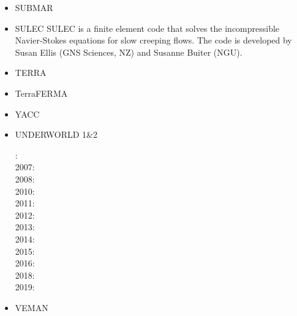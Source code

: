 \begin{itemize}
\item SUBMAR
\cite{masr06}
\cite{masp07}
\cite{roms10}


\item SULEC
SULEC is a finite element code that solves the incompressible Navier-Stokes equations 
for slow creeping flows. The code is developed by Susan Ellis 
(GNS Sciences, NZ) and Susanne Buiter (NGU). 

\cite{qube11}
\cite{ellw11}
\cite{buit12}
\cite{tebu12} 
\cite{crsg12}
\cite{grel12}
\cite{ghbu13}
\cite{ghbu14}
\cite{qubu14}
\cite{nabu15}
\cite{zwsn16}
\cite{tebu17}










\item TERRA
\cite{burb97}
\cite{burl98}
\cite{phbs09}
\cite{wodd09}
\cite{woda11}
\cite{dadb13}
\cite{vade16}

\item TerraFERMA
\cite{wisv14}
\cite{wisv17}
\cite{spmw16}
\cite{ceww17}
\cite{ceww19}


\item YACC
\cite{tosn15}
\cite{tomy16}

\item UNDERWORLD 1\&2

: \cite{stfs06}\\
2007: \cite{moql07}\cite{stfs07}\\
2008: \cite{lemm08}\cite{ozrs08}\\
2010: \cite{casm10}\cite{mamb10}\cite{stsf10}\cite{stfc10}\cite{fasm10}\\
2011: \cite{memm11}\cite{cafz11}\\
2012: \cite{cafa12}\\
2013: \cite{bemm13}\cite{scmo13}\cite{faca13}\cite{care13}\\
2014: \cite{famc14}\\
2015: \cite{quxm15}\cite{bemm15}\cite{scsp15}\cite{shmj15}\\
2016: \cite{shmv16}\cite{onlw16}\cite{kicf16}\\
2018: \cite{memm18}\\
2019: \cite{samo19}\cite{yamg19}

\item VEMAN
\cite{bepo10}


\end{itemize}
